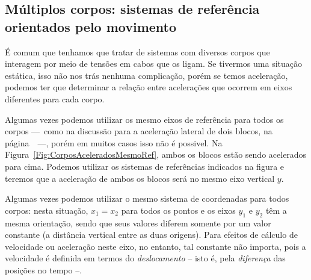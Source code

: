 \subsection{Múltiplos corpos: sistemas de referência orientados pelo movimento}

É comum que tenhamos que tratar de sistemas com diversos corpos que interagem por meio de tensões em cabos que os ligam. Se tivermos uma situação estática, isso não nos trás nenhuma complicação, porém se temos aceleração, podemos ter que determinar a relação entre acelerações que ocorrem em eixos diferentes para cada corpo.

Algumas vezes podemos utilizar os mesmo eixos de referência para todos os corpos ---~como na discussão para a aceleração lateral de dois blocos, na página~\pageref{Par:Discussao:TensaoEmCordaQueLigaDoisBlocos}~---, porém em muitos casos isso não é possivel. Na Figura~\ref{Fig:CorposAceleradosMesmoRef}, ambos os blocos estão sendo acelerados para cima. Podemos utilizar os sistemas de referências indicados na figura e teremos que a aceleração de ambos os blocos será no mesmo eixo vertical $y$. 

\begin{marginfigure}
\centering
{}
\caption{Algumas vezes podemos utilizar o mesmo sistema de coordenadas para todos corpos: nesta situação, $x_1=x_2$ para todos os pontos e os eixos $y_1$ e $y_2$ têm a mesma orientação, sendo que seus valores diferem somente por um valor constante (a distância vertical entre as duas origens). Para efeitos de cálculo de velocidade ou aceleração neste eixo, no entanto, tal constante não importa, pois a velocidade é definida em termos do \emph{deslocamento} -- isto é, pela \emph{diferença} das posições no tempo --.\label{Fig:CorposAceleradosMesmoRef}}
\end{marginfigure}

